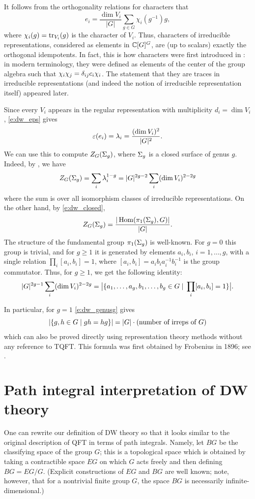 \begin{remark}\label{r:characters}
  It follows from the orthogonality relations for characters that
  $$
    e_i =\frac{\dim V_i}{|G|} \sum_{g\in G}\chi_i(g^{-1})g,
  $$
  where $\chi_i(g)=\operatorname{tr}_{V_i}(g)$ is the character of $V_i$. Thus, characters of
  irreducible representations, considered as elements in $\mathbb{C}[G]^G$, are (up to
  scalars) exactly the orthogonal idempotents. In fact, this is how characters
  were first introduced in : in modern terminology,
  they were defined as elements of the center of the group algebra such that
  $\chi_i\chi_j = \delta_{ij}c_i\chi_i$. The statement that they are traces in
  irreducible representations (and indeed the notion of irreducible
  representation itself) appeared later.
\end{remark}

Since every $V_i$ appears in the regular representation with
multiplicity $d_i=\dim V_i$, \eqref{e:dw_eps} gives
$$
  \varepsilon(e_i) = \lambda_i = \frac{(\dim V_i)^2}{|G|^2}.
$$
We can use this to compute $Z_G(\Sigma_g)$, where $\Sigma_g$ is a closed
surface of genus $g$. Indeed, by , we have
$$
  Z_G(\Sigma_g)= \sum_i \lambda_i^{1-g} = |G|^{2g-2} \sum_i (\dim V_i)^{2-2g}
$$
where the sum is over all isomorphism classes of irreducible representations.
On the other hand, by \eqref{e:dw_closed},
$$
  Z_G(\Sigma_g) =\frac{|\operatorname{Hom}(\pi_1(\Sigma_g), G)|}{|G|}.
$$
The structure of the fundamental group $\pi_1(\Sigma_g)$ is well-known. For
$g=0$ this group is trivial, and for $g\ge 1$ it is generated by elements
$a_i, b_i$, $i=1, \dots, g$, with a single relation $\prod_i [a_i,b_i]=1$,
where $[a_i,b_i] = a_ib_ia_i^{-1}b_i^{-1}$ is the group commutator. Thus,
for $g\ge 1$, we get the following identity:
\begin{equation}\label{e:dw_genusg}
  |G|^{2g-1} \sum_i (\dim V_i)^{2-2g}
  =\bigl|
    \{a_1, \dots, a_g, b_1, \dots, b_g\in G\; | \; \prod_i [a_i,b_i]=1\}
    \bigr|.
\end{equation}

In particular, for $g=1$ \eqref{e:dw_genusg} gives
$$
  |\{g,h\in G\; | \; gh=hg\}|=|G|\cdot (\text{number of irreps of $G$})
$$
which can also be proved directly using representation theory methods without
any reference to TQFT. This formula was first obtained by Frobenius in 1896;
see .

\section{Path integral interpretation of DW theory}\label{s:DW-path-integral}
One can rewrite our definition of DW theory so that it looks similar to the
original description of QFT in terms of path integrals. Namely, let $BG$
be the classifying space of the group $G$; this is a topological space which
is obtained by taking a contractible space $EG$ on which $G$ acts freely and
then defining $BG=EG/G$. (Explicit constructions of $EG$ and $BG$ are
well known; note, however, that for a nontrivial finite group $G$, the space
$BG$ is necessarily infinite-dimensional.)

